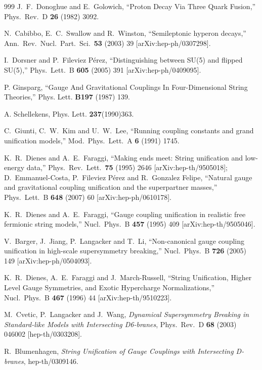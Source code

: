 \begin{thebibliography}{999}
  J.~F.~Donoghue and E.~Golowich,
  ``Proton Decay Via Three Quark Fusion,''
  Phys.\ Rev.\ D {\bf 26} (1982) 3092.

  N.~Cabibbo, E.~C.~Swallow and R.~Winston,
  ``Semileptonic hyperon decays,''
  Ann.\ Rev.\ Nucl.\ Part.\ Sci.\  {\bf 53} (2003) 39
  [arXiv:hep-ph/0307298].

  I.~Dorsner and P.~Fileviez P\'erez,
  ``Distinguishing between SU(5) and flipped SU(5),''
  Phys.\ Lett.\ B {\bf 605} (2005) 391
  [arXiv:hep-ph/0409095].

P.
Ginsparg, ``Gauge And Gravitational Couplings In Four-Dimensional
String Theories,'' Phys. Lett. {\bf B197} (1987) 139.

A. Schellekens, Phys. Lett. {\bf 237}(1990)363.

  C.~Giunti, C.~W.~Kim and U.~W.~Lee,
  ``Running coupling constants and grand unification models,''
  Mod.\ Phys.\ Lett.\ A {\bf 6} (1991) 1745.

  K.~R.~Dienes and A.~E.~Faraggi,
  ``Making ends meet: String unification and low-energy data,''
  Phys.\ Rev.\ Lett.\  {\bf 75} (1995) 2646
  [arXiv:hep-th/9505018];
  D.~Emmanuel-Costa, P.~Fileviez P\'erez and R.~Gonzalez Felipe,
  ``Natural gauge and gravitational coupling unification and the superpartner
  masses,''
  Phys.\ Lett.\  B {\bf 648} (2007) 60
  [arXiv:hep-ph/0610178].


  K.~R.~Dienes and A.~E.~Faraggi,
  ``Gauge coupling unification in realistic free fermionic string models,''
  Nucl.\ Phys.\ B {\bf 457} (1995) 409
  [arXiv:hep-th/9505046].

  V.~Barger, J.~Jiang, P.~Langacker and T.~Li,
  ``Non-canonical gauge coupling unification in high-scale supersymmetry
  breaking,''
  Nucl.\ Phys.\  B {\bf 726} (2005) 149
  [arXiv:hep-ph/0504093].


  K.~R.~Dienes, A.~E.~Faraggi and J.~March-Russell,
  ``String Unification, Higher Level Gauge Symmetries, and Exotic Hypercharge
  Normalizations,''
  Nucl.\ Phys.\ B {\bf 467} (1996) 44
  [arXiv:hep-th/9510223].

M.~Cvetic, P.~Langacker and J.~Wang,
{\it Dynamical Supersymmetry Breaking in Standard-like Models with Intersecting D6-branes},
Phys.\ Rev.\ D {\bf 68} (2003) 046002
[hep-th/0303208].

R.~Blumenhagen,
{\it String Unification of Gauge Couplings with Intersecting D-branes},
hep-th/0309146.

\end{thebibliography}
